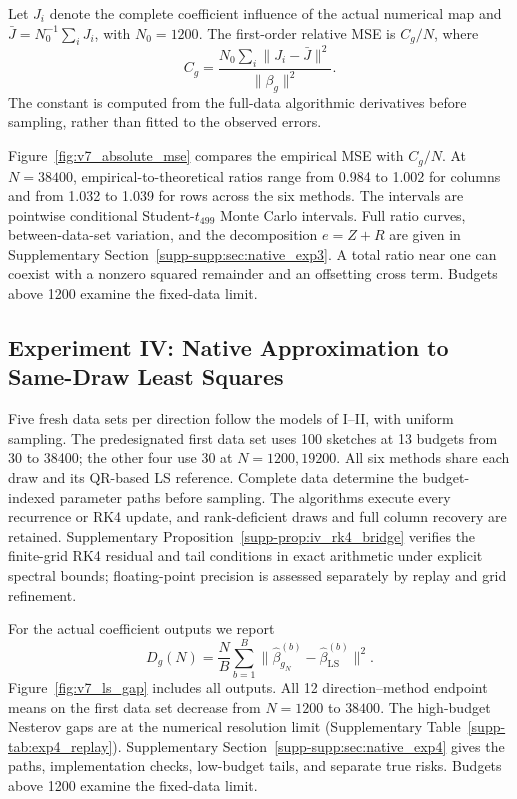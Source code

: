 \documentclass[pdflatex,iicol,sn-mathphys-ay]{sn-jnl}
\theoremstyle{thmstyleone}
\theoremstyle{thmstylethree}
\theoremstyle{thmstyletwo}
\begin{document}
Let $J_i$ denote the complete coefficient influence of the actual numerical
map and $\bar J=N_0^{-1}\sum_iJ_i$, with $N_0=1200$.
The first-order relative MSE is $C_g/N$, where
\[
 C_g=\frac{N_0\sum_i\|J_i-\bar J\|^2}{\|\beta_g\|^2}.
\]
The constant is computed from the full-data algorithmic derivatives before
sampling, rather than fitted to the observed errors.

Figure~\ref{fig:v7_absolute_mse} compares the empirical MSE with $C_g/N$.
At $N=38400$, empirical-to-theoretical ratios range from 0.984 to 1.002 for
columns and from 1.032 to 1.039 for rows across the six methods. The intervals are
pointwise conditional Student-$t_{499}$ Monte Carlo intervals.
Full ratio curves, between-data-set variation, and the decomposition $e=Z+R$
are given in Supplementary Section~\ref{supp-supp:sec:native_exp3}.
A total ratio near one can coexist with a nonzero squared remainder and
an offsetting cross term. Budgets above 1200 examine the fixed-data limit.


\subsection{Experiment IV: Native Approximation to Same-Draw Least Squares}
\label{subsec:v7_ls}
Five fresh data sets per direction follow the models of I--II, with uniform
sampling. The predesignated first data set uses 100 sketches at 13 budgets
from 30 to 38400; the other four use 30 at $N=1200,19200$.
All six methods share each draw and its QR-based LS reference.
Complete data determine the budget-indexed parameter paths before sampling.
The algorithms execute every recurrence or RK4 update, and rank-deficient
draws and full column recovery are retained.
Supplementary Proposition~\ref{supp-prop:iv_rk4_bridge} verifies the finite-grid
RK4 residual and tail conditions in exact arithmetic under explicit spectral
bounds; floating-point precision is assessed separately by replay and grid
refinement.

For the actual coefficient outputs we report
\[
 D_g(N)=\frac NB\sum_{b=1}^B
 \|\widehat\beta_{g_N}^{(b)}-\widehat\beta_{\mathrm{LS}}^{(b)}\|^2.
\]
Figure~\ref{fig:v7_ls_gap} includes all outputs. All 12 direction--method
endpoint means on the first data set decrease from $N=1200$ to $38400$.
The high-budget Nesterov gaps are at the numerical resolution limit
(Supplementary Table~\ref{supp-tab:exp4_replay}).
Supplementary Section~\ref{supp-supp:sec:native_exp4} gives the paths,
implementation checks, low-budget tails, and separate true risks.
Budgets above 1200 examine the fixed-data limit.
\end{document}
